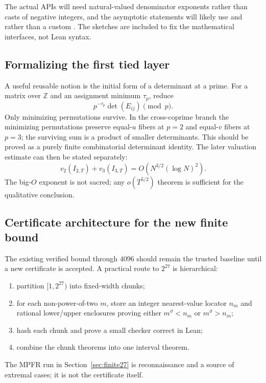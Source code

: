 \documentclass[11pt,oneside]{article}
\theoremstyle{definition}
\theoremstyle{remark}
\newcommand{\Z}{\mathbb Z}
\newcommand{\lean}[1]{\texttt{\detokenize{#1}}}
\begin{document}
The actual APIs will need natural-valued denominator exponents rather than casts of negative
integers, and the asymptotic statements will likely use \lean{Tendsto} and \lean{IsLittleO}
rather than a custom \lean{limsup}.  The sketches are included to fix the mathematical
interfaces, not Lean syntax.

\subsection{Formalizing the first tied layer}

A useful reusable notion is the initial form of a determinant at a prime.  For a matrix over
$\Z$ and an assignment minimum $\tau_p$, reduce
\[
 p^{-\tau_p}\det(E_{ij})\pmod p.
\]
Only minimizing permutations survive.  In the cross-coprime branch the minimizing
permutations preserve equal-$u$ fibers at $p=2$ and equal-$v$ fibers at $p=3$; the surviving
sum is a product of smaller determinants.  This should be proved as a purely finite
combinatorial determinant identity.  The later valuation estimate can then be stated
separately:
\begin{equation}\label{eq:initial-form-bound-formal}
  v_2(I_{2,T})+v_3(I_{3,T})
  =O\!\left(N^{3/2}(\log N)^2\right).
\end{equation}
The big-$O$ exponent is not sacred; any $o(T^{5/2})$ theorem is sufficient for the qualitative
conclusion.

\subsection{Certificate architecture for the new finite bound}

The existing verified bound through $4096$ should remain the trusted baseline until a new
certificate is accepted.  A practical route to $2^{27}$ is hierarchical:
\begin{enumerate}
\item partition $[1,2^{27})$ into fixed-width chunks;
\item for each non-power-of-two $m$, store an integer nearest-value locator $n_m$ and rational
      lower/upper enclosures proving either $m^\vartheta<n_m$ or $m^\vartheta>n_m$;
\item hash each chunk and prove a small checker correct in Lean;
\item combine the chunk theorems into one interval theorem.
\end{enumerate}
The MPFR run in Section~\ref{sec:finite27} is reconnaissance and a source of extremal cases;
it is not the certificate itself.
\end{document}

